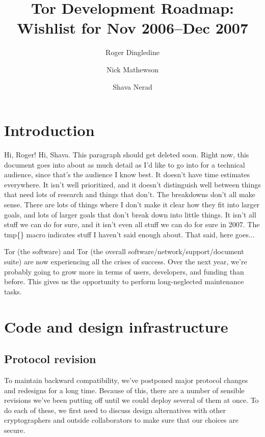 \documentclass{article}
\begin{document}
\title{Tor Development Roadmap: Wishlist for Nov 2006--Dec 2007}
\author{Roger Dingledine \and Nick Mathewson \and Shava Nerad}

\maketitle
\pagestyle{plain}

\section{Introduction}
Hi, Roger!  Hi, Shava.  This paragraph should get deleted soon.  Right now,
this document goes into about as much detail as I'd like to go into for a
technical audience, since that's the audience I know best.  It doesn't have
time estimates everywhere.  It isn't well prioritized, and it doesn't
distinguish well between things that need lots of research and things that
don't.  The breakdowns don't all make sense.  There are lots of things where
I don't make it clear how they fit into larger goals, and lots of larger
goals that don't break down into little things. It isn't all stuff we can do
for sure, and it isn't even all stuff we can do for sure in 2007.  The
tmp\{\} macro indicates stuff I haven't said enough about.  That said, here
goes...

Tor (the software) and Tor (the overall software/network/support/document
suite) are now experiencing all the crises of success.  Over the next year,
we're probably going to grow more in terms of users, developers, and funding
than before.  This gives us the opportunity to perform long-neglected
maintenance tasks.

\section{Code and design infrastructure}

\subsection{Protocol revision}
To maintain backward compatibility, we've postponed major protocol
changes and redesigns for a long time.  Because of this, there are a number
of sensible revisions we've been putting off until we could deploy several of
them at once.  To do each of these, we first need to discuss design
alternatives with other cryptographers and outside collaborators to
make sure that our choices are secure.
\end{document}
